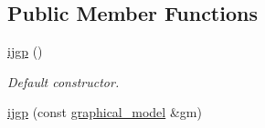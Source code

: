 \subsection*{Public Member Functions}
\begin{DoxyCompactItemize}
\item 
\hyperlink{classmerlin_1_1ijgp_aeb0d9c018731a8bb51b5b0c3adb3ecfd}{ijgp} ()\hypertarget{classmerlin_1_1ijgp_aeb0d9c018731a8bb51b5b0c3adb3ecfd}{}\label{classmerlin_1_1ijgp_aeb0d9c018731a8bb51b5b0c3adb3ecfd}

\begin{DoxyCompactList}\small\item\em Default constructor. \end{DoxyCompactList}\item 
\hyperlink{classmerlin_1_1ijgp_ac2c784827467ac082b34f717ed5a8b28}{ijgp} (const \hyperlink{classmerlin_1_1graphical__model}{graphical\+\_\+model} \&gm)\hypertarget{classmerlin_1_1ijgp_ac2c784827467ac082b34f717ed5a8b28}{}\label{classmerlin_1_1ijgp_ac2c784827467ac082b34f717ed5a8b28}


\end{DoxyCompactItemize}
